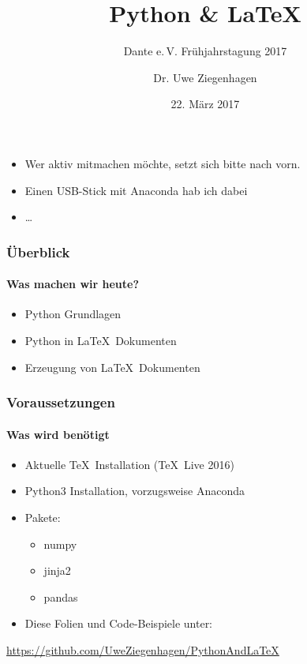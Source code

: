 \documentclass[12pt,ngerman]{beamer}
\author{Dr. Uwe Ziegenhagen}
\title{Python \& \LaTeX}
\subtitle{Dante e.\,V. Frühjahrstagung 2017}
\date{22. März 2017}
\begin{document}
\begin{frame}

\begin{itemize}
	\item Wer aktiv mitmachen möchte, setzt sich bitte nach vorn.
	\item Einen USB-Stick mit Anaconda hab ich dabei
	\item \ldots
	\end{itemize}
\end{frame}

\begin{frame}

\maketitle

\end{frame}


\begin{frame}
\frametitle{Überblick}
\framesubtitle{Was machen wir heute?}

\begin{itemize}
\item Python Grundlagen
\item Python in \LaTeX\ Dokumenten
\item Erzeugung von \LaTeX\ Dokumenten
\end{itemize}
\end{frame}


\begin{frame}
\frametitle{Voraussetzungen}
\framesubtitle{Was wird benötigt}

\begin{itemize}
\item Aktuelle \TeX\ Installation (\TeX~Live 2016)
\item Python3 Installation, vorzugsweise Anaconda
\item Pakete:
\begin{itemize}
	\item numpy
	\item jinja2
	\item pandas
\end{itemize}
\item Diese Folien und Code-Beispiele unter: 
\end{itemize}

\url{https://github.com/UweZiegenhagen/PythonAndLaTeX}

\end{frame}
\end{document}
